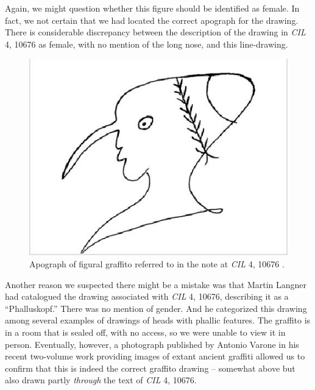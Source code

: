 \documentclass[amsthm,ebook]{saparticle}
\begin{document}
Again, we might question whether this figure should be identified as female. In fact, we not certain that we had located
the correct apograph for the drawing. There is considerable discrepancy between the description of the drawing in \emph{CIL}
4, 10676 as female, with no mention of the long nose, and this line-drawing. 


\begin{figure}[!hbp]
\centering
 \includegraphics[width=\columnwidth]{EAGLE2016BenefielSypniewski-img007.jpg}
\caption{Apograph of figural graffito referred to in the note at \emph{CIL} 4, 10676 \citet[n. 309]{langner_antike_2001}.}
\label{fig:7}
\end{figure}


Another reason we suspected there might be a mistake was that Martin Langner had catalogued the drawing associated with
\emph{CIL} 4, 10676, describing it as a ``Phalluskopf.'' There was no mention of gender. And he categorized this drawing among
several examples of drawings of heads with phallic features. The graffito is in a room that is sealed off, with no
access, so we were unable to view it in person. Eventually, however, a photograph published by Antonio Varone in his
recent two-volume work providing images of extant ancient graffiti \citep[509]{varone_titulorum_2012} allowed us to confirm that this
is indeed the correct graffito drawing – somewhat above but also drawn partly \emph{through} the text of \emph{CIL} 4, 10676. 
\end{document}
